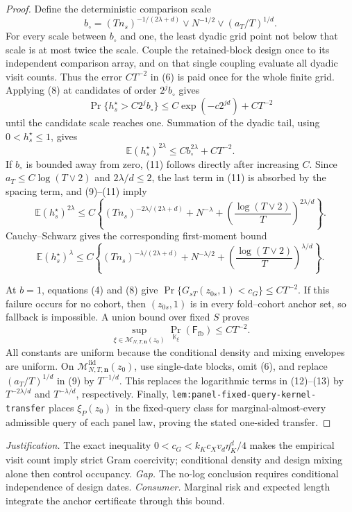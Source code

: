 \documentclass{article}
\begin{document}
\begin{proof}
Define the deterministic comparison scale
\[
 b_\circ=(Tn_s)^{-1/(2\lambda+d)}\vee N^{-1/2}
 \vee(a_T/T)^{1/d}.                                        \tag{9}
\]
For every scale between \(b_\circ\) and one, the least dyadic grid point not below that scale is at most twice the scale.  Couple the retained-block design once to its independent comparison array, and on that single coupling evaluate all dyadic visit counts.  Thus the error \(CT^{-2}\) in (6) is paid once for the whole finite grid.  Applying (8) at candidates of order \(2^jb_\circ\) gives
\[
 \Pr\{h_s^\star>C2^jb_\circ\}
 \le C\exp(-c2^{jd})+CT^{-2}                               \tag{10}
\]
until the candidate scale reaches one.  Summation of the dyadic tail, using \(0<h_s^\star\le1\), gives
\[
 \mathbb E(h_s^\star)^{2\lambda}
 \le Cb_\circ^{2\lambda}+CT^{-2}.                         \tag{11}
\]
If \(b_\circ\) is bounded away from zero, (11) follows directly after increasing \(C\).  Since \(a_T\le C\log(T\vee2)\) and \(2\lambda/d\le2\), the last term in (11) is absorbed by the spacing term, and (9)--(11) imply
\[
 \mathbb E(h_s^\star)^{2\lambda}
 \le C\left\{(Tn_s)^{-2\lambda/(2\lambda+d)}+N^{-\lambda}
 +\left(\frac{\log(T\vee2)}{T}\right)^{2\lambda/d}\right\}. \tag{12}
\]
Cauchy--Schwarz gives the corresponding first-moment bound
\[
 \mathbb E(h_s^\star)^\lambda
 \le C\left\{(Tn_s)^{-\lambda/(2\lambda+d)}+N^{-\lambda/2}
 +\left(\frac{\log(T\vee2)}{T}\right)^{\lambda/d}\right\}. \tag{13}
\]

At \(b=1\), equations (4) and (8) give
\(\Pr\{G_{sT}(z_{0s},1)<c_G\}\le CT^{-2}\).  If this failure occurs for no cohort, then \((z_{0s},1)\) is in every fold--cohort anchor set, so fallback is impossible.  A union bound over fixed \(S\) proves
\[
 \sup_{\xi\in\mathcal M_{N,T,\mathbf n}(z_0)}
 \Pr_{\mathbb K_\xi}(\mathsf F_{\mathrm{fb}})\le CT^{-2}. \tag{14}
\]
All constants are uniform because the conditional density and mixing envelopes are uniform.  On
\(\mathcal M^{\mathrm{iid}}_{N,T,\mathbf n}(z_0)\), use single-date blocks, omit (6), and replace \((a_T/T)^{1/d}\) in (9) by \(T^{-1/d}\).  This replaces the logarithmic terms in (12)--(13) by \(T^{-2\lambda/d}\) and \(T^{-\lambda/d}\), respectively.  Finally, \texttt{lem:panel-fixed-query-kernel-transfer} places \(\xi_P(z_0)\) in the fixed-query class for marginal-almost-every admissible query of each panel law, proving the stated one-sided transfer.
\end{proof}
\par\smallskip\noindent \textit{Justification.} The exact inequality \(0<c_G<k_Kc_Xv_d\eta_K^d/4\) makes the empirical visit count imply strict Gram coercivity; conditional density and design mixing alone then control occupancy. \textit{Gap.} The no-log conclusion requires conditional independence of design dates. \textit{Consumer.} Marginal risk and expected length integrate the anchor certificate through this bound.
\end{document}
